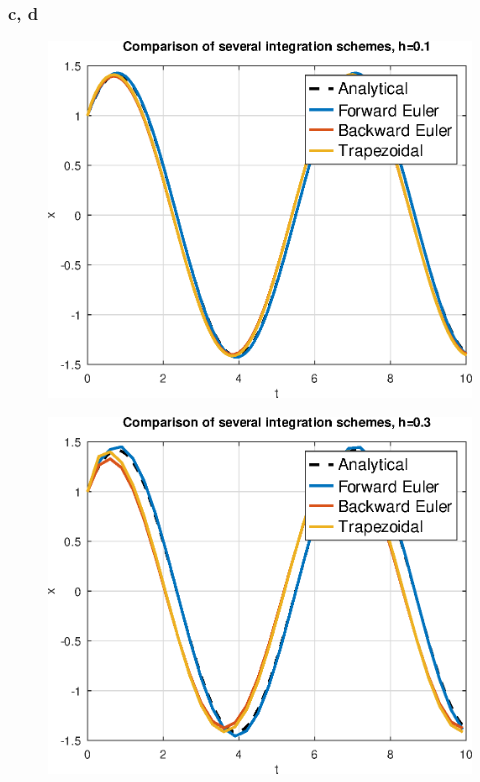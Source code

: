 \documentclass[11pt]{report}
\theoremstyle{definition}
\begin{document}
\subsubsection*{c, d}

\begin{figure}[H]
	\includegraphics[width=\textwidth]{integration_0.1.eps}
\end{figure}
\begin{figure}[H]
	\includegraphics[width=\textwidth]{integration_0.3.eps}
\end{figure}
\end{document}
